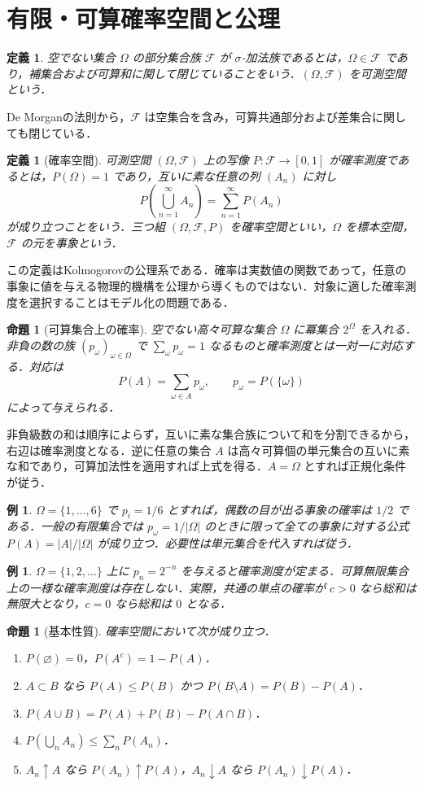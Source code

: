 \documentclass[a5paper,10pt,onecolumn]{jsarticle}
\makeatletter
\theoremstyle{mathnotetheorem}
\newtheorem{definition}[theorem]{定義}
\newtheorem{proposition}[theorem]{命題}
\newtheorem{example}[theorem]{例}
\renewcommand{\proofname}{証明}
\renewenvironment{proof}[1][\proofname]{%
  \par\pushQED{\qed}\normalfont\topsep4\p@\@plus2\p@\relax
  \trivlist\item[\hskip\labelsep\bfseries #1]\ignorespaces
}{\popQED\endtrivlist\@endpefalse}
\newcommand{\F}{\mathcal F}
\newcommand{\1}{\mathbf{1}}
\makeatother
\begin{document}
\section{有限・可算確率空間と公理}
\begin{definition}
空でない集合 $\Omega$ の部分集合族 $\F$ が $\sigma$-加法族であるとは，$\Omega\in\F$ であり，補集合および可算和に関して閉じていることをいう．$(\Omega,\F)$ を可測空間という．
\end{definition}
De Morganの法則から，$\F$ は空集合を含み，可算共通部分および差集合に関しても閉じている．
\begin{definition}[確率空間]
可測空間 $(\Omega,\F)$ 上の写像 $P:\F\to[0,1]$ が確率測度であるとは，$P(\Omega)=1$ であり，互いに素な任意の列 $(A_n)$ に対し
\[
 P\left(\bigcup_{n=1}^\infty A_n\right)=\sum_{n=1}^\infty P(A_n)
\]
が成り立つことをいう．三つ組 $(\Omega,\F,P)$ を確率空間といい，$\Omega$ を標本空間，$\F$ の元を事象という．
\end{definition}
この定義はKolmogorovの公理系である．確率は実数値の関数であって，任意の事象に値を与える物理的機構を公理から導くものではない．対象に適した確率測度を選択することはモデル化の問題である．
\begin{proposition}[可算集合上の確率]
空でない高々可算な集合 $\Omega$ に冪集合 $2^\Omega$ を入れる．非負の数の族 $(p_\omega)_{\omega\in\Omega}$ で $\sum_\omega p_\omega=1$ なるものと確率測度とは一対一に対応する．対応は
\[
 P(A)=\sum_{\omega\in A}p_\omega,\qquad
 p_\omega=P(\{\omega\})
\]
によって与えられる．
\end{proposition}
\begin{proof}
非負級数の和は順序によらず，互いに素な集合族について和を分割できるから，右辺は確率測度となる．逆に任意の集合 $A$ は高々可算個の単元集合の互いに素な和であり，可算加法性を適用すれば上式を得る．$A=\Omega$ とすれば正規化条件が従う．
\end{proof}
\begin{example}
$\Omega=\{1,\ldots,6\}$ で $p_i=1/6$ とすれば，偶数の目が出る事象の確率は $1/2$ である．一般の有限集合では $p_\omega=1/|\Omega|$ のときに限って全ての事象に対する公式 $P(A)=|A|/|\Omega|$ が成り立つ．必要性は単元集合を代入すれば従う．
\end{example}
\begin{example}
$\Omega=\{1,2,\ldots\}$ 上に $p_n=2^{-n}$ を与えると確率測度が定まる．可算無限集合上の一様な確率測度は存在しない．実際，共通の単点の確率が $c>0$ なら総和は無限大となり，$c=0$ なら総和は $0$ となる．
\end{example}
\begin{proposition}[基本性質]\label{basic}
確率空間において次が成り立つ．
\begin{enumerate}
\item $P(\varnothing)=0$，$P(A^c)=1-P(A)$．
\item $A\subset B$ なら $P(A)\le P(B)$ かつ $P(B\setminus A)=P(B)-P(A)$．
\item $P(A\cup B)=P(A)+P(B)-P(A\cap B)$．
\item $P(\bigcup_n A_n)\le\sum_nP(A_n)$．
\item $A_n\uparrow A$ なら $P(A_n)\uparrow P(A)$，$A_n\downarrow A$ なら $P(A_n)\downarrow P(A)$．
\end{enumerate}
\end{proposition}
\end{document}
